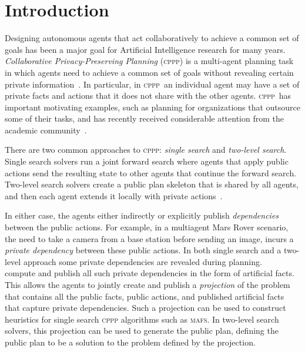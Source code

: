 \documentclass{article}
\newcommand{\cppp}{\textsc {cppp}\xspace}
\newcommand{\mafs}{\textsc {mafs}\xspace}
\newcommand{\roni}[1]{\textbf{\color{blue}[RONI:#1]}}
\theoremstyle{remark}
\newcommand{\citet}[1]{\citeauthor{#1}~\shortcite{#1}}
\newcommand{\citep}[1]{\cite{#1}}
\begin{document}







\section{Introduction}

Designing autonomous agents that act collaboratively to achieve a common set of goals has been a major goal for Artificial Intelligence research for many years. 
\emph{Collaborative Privacy-Preserving Planning} (\cppp) is a multi-agent planning task in which agents need to achieve a common set of goals without revealing certain private information~\citep{brafman2008one}. In particular, in \cppp\ an individual agent may have a set of private facts and actions that it does not share with the other agents. \cppp\ has important motivating examples, such as planning for organizations that outsource some of their tasks, 
 and has recently received considerable attention from the academic community~\cite{nissim2014distributed,Brafman15,Torreno,tozicka2017theLimits,maliah2018action,caspari2020aFramework}.


There are two common approaches to \cppp: \emph{single search} and \emph{two-level search}.  
Single search solvers run a joint forward search \cite{nissim2014distributed,MADLA} where agents that apply public actions send the resulting state to other agents that continue the forward search. 
Two-level search solvers create a public plan skeleton that is shared by all agents, and then each agent extends it locally with private actions~\cite{maliah2015privacy}.

In either case, the agents either indirectly or explicitly publish \emph{dependencies} between the public actions. 
For example, in a multiagent Mars Rover scenario, the need to take a camera from a base station before sending an image, incurs a {\em private dependency} between these public actions. In both single search and a two-level approach some private dependencies are revealed during planning.
\citet{maliah2016projections} compute and publish all such private dependencies in the form of artificial facts. This allows the agents to jointly create and publish a \emph{projection} of the problem that contains all the public facts, public actions, and published artificial facts that capture private dependencies. 
Such a projection can be used to construct heuristics for single search \cppp algorithms such as \mafs. 
In two-level search solvers, this projection can be used to generate the public plan, defining the public plan to be a solution to the problem defined by the projection. 
\end{document}
